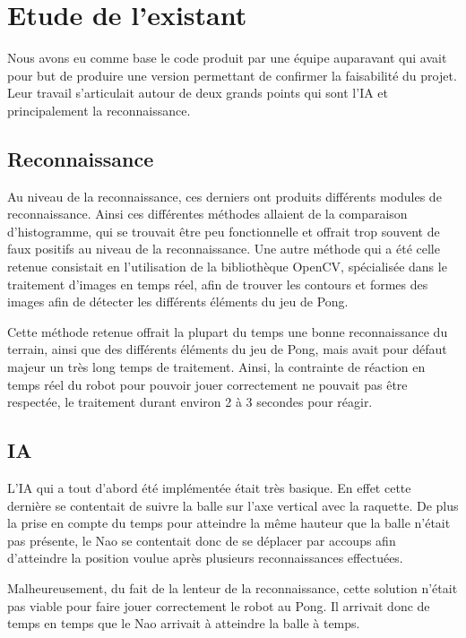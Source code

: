 \section{Etude de l'existant}
\label{sec:Etude de l'existant}
\par Nous avons eu comme base le code produit par une équipe auparavant qui avait pour 
but de produire une version permettant de confirmer la faisabilité du projet. Leur travail 
s'articulait autour de deux grands points qui sont l'IA et principalement la reconnaissance.

    \subsection{Reconnaissance}
    \par Au niveau de la reconnaissance, ces derniers ont produits différents modules de 
    reconnaissance. Ainsi ces différentes méthodes allaient de la comparaison d'histogramme, 
    qui se trouvait être peu fonctionnelle et offrait trop souvent de faux positifs au niveau 
    de la reconnaissance. Une autre méthode qui a été celle retenue consistait en l'utilisation 
    de la bibliothèque OpenCV, spécialisée dans le traitement d'images en temps réel, afin de 
    trouver les contours et formes des images afin de détecter les différents éléments du jeu de Pong.
    
    \par Cette méthode retenue offrait la plupart du temps une bonne reconnaissance du terrain,
    ainsi que des différents éléments du jeu de Pong, mais avait pour défaut majeur un très long 
    temps de traitement. Ainsi, la contrainte de réaction en temps réel du robot pour pouvoir jouer 
    correctement ne pouvait pas être respectée, le traitement durant environ 2 à 3 secondes pour réagir.
    
    \subsection{IA}
    \par L'IA qui a tout d'abord été implémentée était très basique. En effet cette dernière se contentait 
    de suivre la balle sur l'axe vertical avec la raquette. De plus la prise en compte du temps pour atteindre 
    la même hauteur que la balle n'était pas présente, le Nao se contentait donc de se déplacer par accoups afin 
    d'atteindre la position voulue après plusieurs reconnaissances effectuées.
    
    \par Malheureusement, du fait de la lenteur de la reconnaissance, cette solution n'était pas viable 
    pour faire jouer correctement le robot au Pong. Il arrivait donc de temps en temps que le Nao arrivait à 
    atteindre la balle à temps.
    
